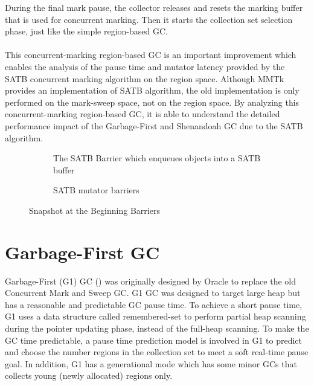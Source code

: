 During the final mark pause, the collector releases and resets the marking buffer that
is used for concurrent marking. Then it starts the collection set selection phase, just like the
simple region-based GC.
\\\\

This concurrent-marking region-based GC is an important improvement which enables
the analysis of the pause time and mutator latency provided by the SATB concurrent marking algorithm on the region space.
Although MMTk provides an implementation of SATB algorithm, the old implementation
is only performed on the mark-sweep space, not on the region space.
By analyzing this concurrent-marking region-based GC, it is able to understand the
detailed performance impact of the Garbage-First and Shenandoah GC due to the SATB algorithm.

\begin{figure}
  \centering
  \begin{subfigure}[a]{\textwidth}
    
    \caption{The SATB Barrier which enqueues objects into a SATB buffer}
    \label{fig:c:hello}
  \end{subfigure}

  \begin{subfigure}[b]{\textwidth}
    
    \caption{SATB mutator barriers}
    \label{fig:c:hello}
  \end{subfigure}

  \caption{Snapshot at the Beginning Barriers}
  \label{fig:satbbarrier}
\end{figure}

\section{Garbage-First GC}
\label{sec:g1gc}

Garbage-First (G1) GC (\cite{detlefs2004garbage}) was originally designed by Oracle to replace
the old Concurrent Mark and Sweep GC. G1 GC was designed to target large heap but
has a reasonable and predictable GC pause time. To achieve a short pause time, G1
uses a data structure called remembered-set to perform partial heap scanning during the
pointer updating phase, instead of the full-heap scanning. To make the GC time predictable,
a pause time prediction model is involved in G1 to predict and choose the number regions in the
collection set to meet a soft real-time pause goal. In addition, G1 has a generational
mode which has some minor GCs that collects young (newly allocated) regions only.

